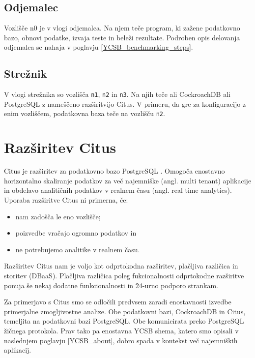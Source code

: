 \documentclass[a4paper, 12pt]{book}
\begin{document}
\subsection{Odjemalec}
Vozlišče n0 je v vlogi odjemalca. Na njem teče program, ki zažene podatkovno bazo, obnovi podatke, izvaja teste in beleži rezultate. Podroben opis delovanja odjemalca se nahaja v poglavju \ref{YCSB_benchmarking_steps}.

\subsection{Strežnik}
V vlogi strežnika so vozlišča \texttt{n1}, \texttt{n2} in \texttt{n3}. Na njih teče ali CockroachDB ali PostgreSQL z nameščeno razširitvijo Citus. V primeru, da gre za konfiguracijo z enim vozliščem, podatkovna baza teče na vozlišču \texttt{n2}.

\section{Razširitev Citus}
\label{benchmarking/citus}
Citus je razširitev za podatkovno bazo PostgreSQL \cite{citus}. Omogoča enostavno horizontalno skaliranje podatkov za več najemniške (angl. multi tenant) aplikacije in obdelavo analitičnih podatkov v realnem času (angl. real time analytics). Uporaba razširitve Citus ni primerna, če:
\begin{itemize}
    \item nam zadošča le eno vozlišče;
    \item poizvedbe vračajo ogromno podatkov in
    \item ne potrebujemo analitike v realnem času.
\end{itemize}

Razširitev Citus nam je voljo kot odprtokodna razširitev, plačljiva različi\-ca in storitev (DBaaS). Plačljiva različica poleg fukcionalnosti odprtokodne raz\-širitve ponuja še nekaj dodatne funkcionalnosti in 24-urno podporo strankam.

Za primerjavo s Citus smo se odločili predvsem zaradi enostavnosti izvedbe primerjalne zmogljivostne analize. Obe podatkovni bazi, CockroachDB in Citus, temeljita na podatkovni bazi PostgreSQL. Obe komunicirata preko PostgreSQL žičnega protokola. Prav tako pa enostavna YCSB shema, katero smo opisali v naslednjem poglavju \ref{YCSB_about}, dobro spada v kontekst več najemniških aplikacij.
\end{document}
